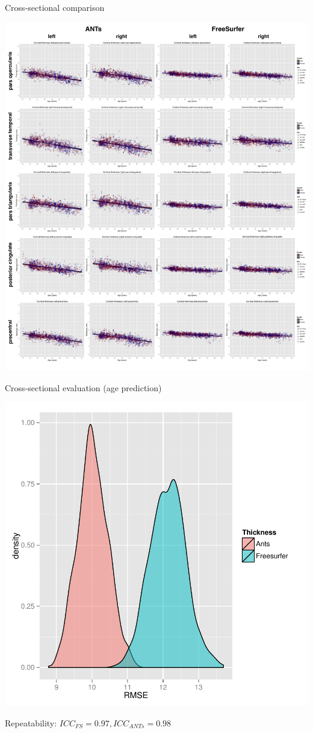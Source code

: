 \documentclass[ignorenonframetext,]{beamer}
\begin{document}
\begin{frame}{Cross-sectional comparison}

\centering
\includegraphics[width=0.99 \textwidth]{../Figures/rfImportanceRegions.pdf}

\end{frame}

\begin{frame}{Cross-sectional evaluation (age prediction)}

\centering
\includegraphics[width=0.5 \textwidth]{../Figures/rfRmse075.pdf}

Repeatability: \(ICC_{FS} = 0.97, ICC_{ANTs} = 0.98\)

\end{frame}
\end{document}
